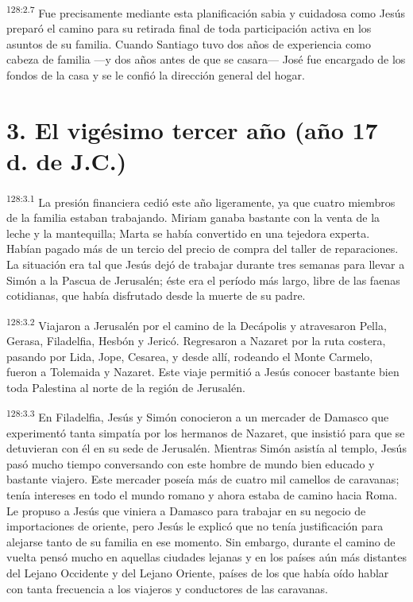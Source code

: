 \par
\textsuperscript{128:2.7} Fue precisamente mediante esta planificación sabia y cuidadosa como Jesús preparó el camino para su retirada final de toda participación activa en los asuntos de su familia. Cuando Santiago tuvo dos años de experiencia como cabeza de familia ---y dos años antes de que se casara--- José fue encargado de los fondos de la casa y se le confió la dirección general del hogar.

\section*{3. El vigésimo tercer año (año 17 d. de J.C.)}
\par
\textsuperscript{128:3.1} La presión financiera cedió este año ligeramente, ya que cuatro miembros de la familia estaban trabajando. Miriam ganaba bastante con la venta de la leche y la mantequilla; Marta se había convertido en una tejedora experta. Habían pagado más de un tercio del precio de compra del taller de reparaciones. La situación era tal que Jesús dejó de trabajar durante tres semanas para llevar a Simón a la Pascua de Jerusalén; éste era el período más largo, libre de las faenas cotidianas, que había disfrutado desde la muerte de su padre.

\par
\textsuperscript{128:3.2} Viajaron a Jerusalén por el camino de la Decápolis y atravesaron Pella, Gerasa, Filadelfia, Hesbón y Jericó. Regresaron a Nazaret por la ruta costera, pasando por Lida, Jope, Cesarea, y desde allí, rodeando el Monte Carmelo, fueron a Tolemaida y Nazaret. Este viaje permitió a Jesús conocer bastante bien toda Palestina al norte de la región de Jerusalén.

\par
\textsuperscript{128:3.3} En Filadelfia, Jesús y Simón conocieron a un mercader de Damasco que experimentó tanta simpatía por los hermanos de Nazaret, que insistió para que se detuvieran con él en su sede de Jerusalén. Mientras Simón asistía al templo, Jesús pasó mucho tiempo conversando con este hombre de mundo bien educado y bastante viajero. Este mercader poseía más de cuatro mil camellos de caravanas; tenía intereses en todo el mundo romano y ahora estaba de camino hacia Roma. Le propuso a Jesús que viniera a Damasco para trabajar en su negocio de importaciones de oriente, pero Jesús le explicó que no tenía justificación para alejarse tanto de su familia en ese momento. Sin embargo, durante el camino de vuelta pensó mucho en aquellas ciudades lejanas y en los países aún más distantes del Lejano Occidente y del Lejano Oriente, países de los que había oído hablar con tanta frecuencia a los viajeros y conductores de las caravanas.

